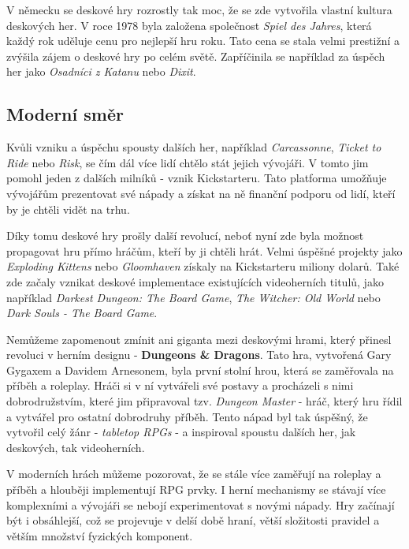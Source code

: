V německu se deskové hry rozrostly tak moc, že se zde vytvořila vlastní kultura deskových her. V roce 1978 byla založena společnost \textit{Spiel des Jahres}, která každý rok uděluje cenu pro nejlepší hru roku. Tato cena se stala velmi prestižní a zvýšila zájem o deskové hry po celém světě. Zapříčinila se například za úspěch her jako \textit{Osadníci z Katanu} nebo \textit{Dixit}. \cite{attia_2018}

\subsection{Moderní směr}
\label{subsec:modern}

Kvůli vzniku a úspěchu spousty dalších her, například \textit{Carcassonne}, \textit{Ticket to Ride} nebo \textit{Risk}, se čím dál více lidí chtělo stát jejich vývojáři. V tomto jim pomohl jeden z dalších milníků - vznik Kickstarteru. Tato platforma umožňuje vývojářům prezentovat své nápady a získat na ně finanční podporu od lidí, kteří by je chtěli vidět na trhu.  \cite{attia_2018}

Díky tomu deskové hry prošly další revolucí, neboť nyní zde byla možnost propagovat hru přímo hráčům, kteří by ji chtěli hrát. Velmi úspěšné projekty jako \textit{Exploding Kittens} nebo \textit{Gloomhaven} získaly na Kickstarteru miliony dolarů. Také zde začaly vznikat deskové implementace existujících videoherních titulů, jako například \textit{Darkest Dungeon: The Board Game}, \textit{The Witcher: Old World} nebo \textit{Dark Souls - The Board Game}. \cite{kickstarter}

Nemůžeme zapomenout zmínit ani giganta mezi deskovými hrami, který přinesl revoluci v herním designu - \textbf{Dungeons \& Dragons}. Tato hra, vytvořená Gary Gygaxem a Davidem Arnesonem, byla první stolní hrou, která se zaměřovala na příběh a roleplay. Hráči si v ní vytvářeli své postavy a procházeli s nimi dobrodružstvím, které jim připravoval tzv. \textit{Dungeon Master} - hráč, který hru řídil a vytvářel pro ostatní dobrodruhy příběh. Tento nápad byl tak úspěšný, že vytvořil celý žánr - \textit{tabletop RPGs} - a inspiroval spoustu dalších her, jak deskových, tak videoherních. \cite{dnd_beyond_2023}

V moderních hrách můžeme pozorovat, že se stále více zaměřují na roleplay a příběh a hlouběji implementují RPG prvky. I herní mechanismy se stávají více komplexními a vývojáři se nebojí experimentovat s novými nápady. Hry začínají být i obsáhlejší, což se projevuje v delší době hraní, větší složitosti pravidel a větším množství fyzických komponent.


